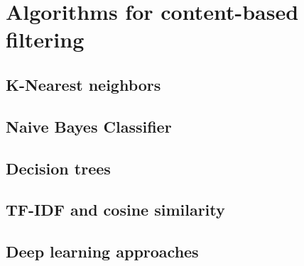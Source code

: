 \section{Algorithms for content-based filtering}\label{sec:cbf_algorithms}

\subsection{K-Nearest neighbors} %

\subsection{Naive Bayes Classifier} %

\subsection{Decision trees} %

\subsection{TF-IDF and cosine similarity} %

\subsection{Deep learning approaches} %